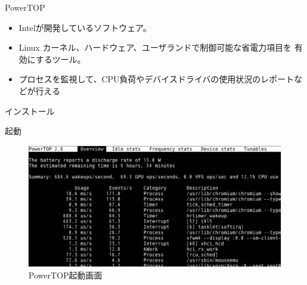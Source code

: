 \begin{frame}{PowerTOP}

\begin{itemize}
\item Intelが開発しているソフトウェア。
\item Linux カーネル、ハードウェア、ユーザランドで制御可能な省電力項目を
有効にするツール。
\item プロセスを監視して、CPU負荷やデバイスドライバの使用状況のレポートなどが行える
\end{itemize}

\end{frame}

\begin{frame}[containsverbatim]{インストール}

\begin{commandline}
\end{commandline}

\end{frame}

\begin{frame}[containsverbatim]{起動}

\begin{figure}[H]
\begin{center}
\includegraphics[width=0.8\hsize]{image201602/powertop_00.png}
\end{center}
\label{fig:powertop0}
\caption{PowerTOP起動画面} 
\end{figure}

\end{frame}

